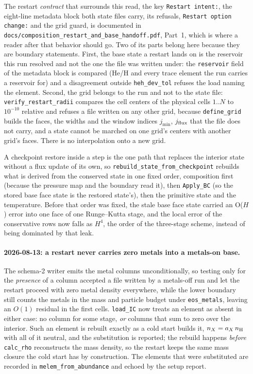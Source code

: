 \documentclass[english,a4paper]{my_memo}
\begin{document}
The restart \emph{contract} that surrounds this read, the key
\texttt{Restart intent:}, the eight-line metadata block both state files
carry, its refusals, \texttt{Restart option change:} and the grid guard, is
documented in \texttt{docs/composition\_restart\_and\_base\_handoff.pdf}, Part~1,
which is where a reader after that behavior should go. Two of its parts
belong here because they are boundary statements. First, the base state a
restart lands on is the reservoir this run resolved and not the one the file
was written under: the \texttt{reservoir} field of the metadata block is
compared (He/H and every trace element the run carries a reservoir for) and
a disagreement outside \texttt{heh\_dev\_tol} refuses the load naming the
element. Second, the grid belongs to the run and not to the state file:
\texttt{verify\_restart\_radii} compares the cell centers of the physical
cells $1..N$ to $10^{-10}$ relative and refuses a file written on any other
grid, because \texttt{define\_grid} builds the faces, the widths and the
window indices $j_{\min}$, $j_{\rm flux}$ that the file does not carry, and
a state cannot be marched on one grid's centers with another grid's faces.
There is no interpolation onto a new grid.

A checkpoint restore inside a step is the one path that replaces the
interior state without a flux update of its own, so
\texttt{rebuild\_state\_from\_checkpoint} rebuilds what is derived from
the conserved state in one fixed order, composition first (because the
pressure map and the boundary read it), then \texttt{Apply\_BC} (so the
stored base face state is the restored state's), then the primitive state
and the temperature. Before that order was fixed, the stale base face state
carried an O($H$) error into one face of one Runge--Kutta stage, and the
local error of the conservative rows now falls as $H^4$, the order of the
three-stage scheme, instead of being dominated by that leak.

\paragraph{2026-08-13: a restart never carries zero metals into a
metals-on base.} The schema-2 writer emits the metal columns
unconditionally, so testing only for the \emph{presence} of a column
accepted a file written by a metals-off run and let the restart proceed
with zero metal density everywhere, while the lower boundary still
counts the metals in the mass and particle budget under
\texttt{eos\_metals}, leaving an $O(1)$ residual in the first cells.
\texttt{load\_IC} now treats an element as absent in either case: no
column for some stage, \emph{or} columns that sum to zero over the
interior. Such an element is rebuilt exactly as a cold start builds it,
$n_X = a_X\,n_{\rm H}$ with all of it neutral, and the substitution is
reported; the rebuild happens \emph{before} \texttt{calc\_rho}
reconstructs the mass density, so the restart keeps the same mass closure
the cold start has by construction. The elements that were substituted are
recorded in \texttt{melem\_from\_abundance} and echoed by the setup report.
\end{document}
